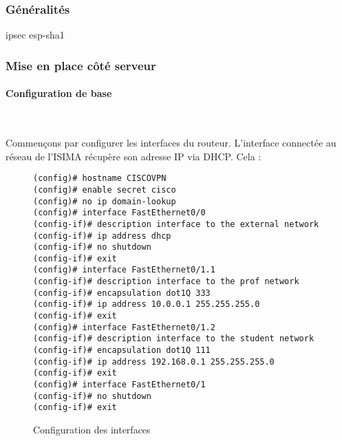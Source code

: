 \subsubsection{Généralités}
ipsec esp-sha1

\subsubsection{Mise en place côté serveur}


\paragraph{Configuration de base}
~

Commençons par configurer les interfaces du routeur. L'interface connectée au réseau de l'ISIMA récupère son adresse IP via DHCP. Cela :
\begin{figure}[H]
	\begin{center}
		\begin{minipage}{0.90\textwidth}
			\begin{lstlisting}[frame=trBL]
(config)# hostname CISCOVPN
(config)# enable secret cisco
(config)# no ip domain-lookup
(config)# interface FastEthernet0/0
(config-if)# description interface to the external network
(config-if)# ip address dhcp
(config-if)# no shutdown
(config-if)# exit
(config)# interface FastEthernet0/1.1
(config-if)# description interface to the prof network
(config-if)# encapsulation dot1Q 333
(config-if)# ip address 10.0.0.1 255.255.255.0
(config-if)# exit
(config)# interface FastEthernet0/1.2
(config-if)# description interface to the student network
(config-if)# encapsulation dot1Q 111
(config-if)# ip address 192.168.0.1 255.255.255.0
(config-if)# exit
(config)# interface FastEthernet0/1
(config-if)# no shutdown
(config-if)# exit
			\end{lstlisting}
		\end{minipage}
	\end{center}
	\caption{Configuration des interfaces}
	\label{configuration_interfaces}
\end{figure}

~

